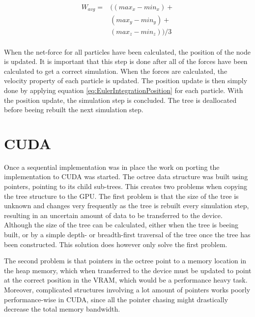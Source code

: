 \begin{equation} \label{eq:Wavg}
    \begin{split}
    W_{avg} = &((max_x - min_x) + \\
              &(max_y - min_y) + \\
              &(max_z - min_z)) / 3 \\
    \end{split}
\end{equation}

When the net-force for all particles have been calculated, the position of the node is updated. It is important that this step is done after all of the forces have been calculated to get a correct simulation.
When the forces are calculated, the velocity property of each particle is updated. The position update is then simply done by applying equation \ref{eq:EulerIntegrationPosition} for each particle. With the position update, the simulation step is concluded. The tree is deallocated before beeing rebuilt the next simulation step. 

\section{CUDA} \label{sec:CUDAImplementation}
Once a sequential implementation was in place the work on porting the implementation to CUDA was started.
The octree data structure was built using pointers, pointing to its child sub-trees. This creates two problems when copying the tree structure to the GPU. The first problem is that the size of the tree is unknown and changes very frequently as the tree is rebuilt every simulation step, resulting in an uncertain amount of data to be transferred to the device. Although the size of the tree can be calculated, either when the tree is beeing built, or by a simple depth- or breadth-first traversal of the tree once the tree has been constructed. This solution does however only solve the first problem.

The second problem is that pointers in the octree point to a memory location in the heap memory, which when transferred to the device must be updated to point at the correct position in the VRAM, which would be a performance heavy task. Moreover, complicated structures involving a lot amount of pointers works poorly performance-wise in CUDA, since all the pointer chasing might drastically decrease the total memory bandwidth. 

